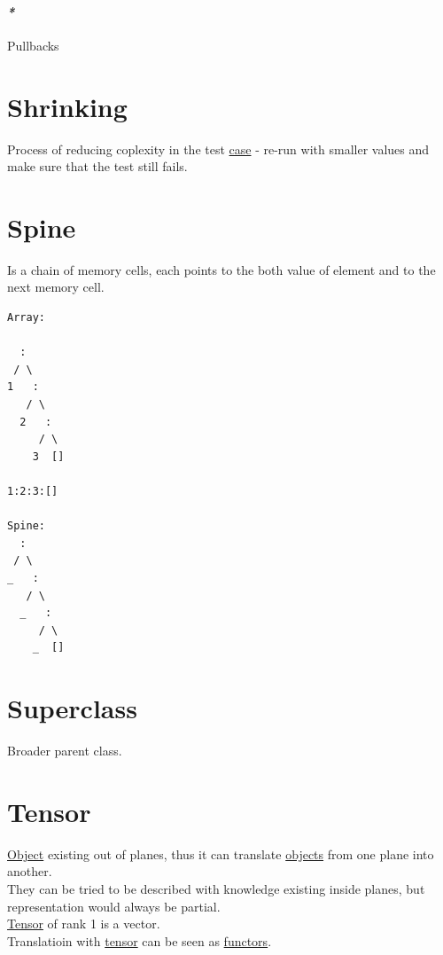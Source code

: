 \documentclass[a4paper,14pt,oneside]{book}
\begin{document}
\subsubsection{\emph{*}}
\label{sec:orgc83582e}
\label{org60d9c2c}Pullbacks\\

\chapter{\label{orge81de6c}Shrinking}
\label{sec:org14a23c2}
Process of reducing coplexity in the test \hyperref[orgcafada5]{case} - re-run with smaller values and make sure that the test still fails.\\

\chapter{\label{org8f6b9a1}Spine}
\label{sec:org7480179}
Is a chain of memory cells, each points to the both value of element and to the next memory cell.\\
\begin{verbatim}
Array:

  :
 / \
1   :
   / \
  2   :
     / \
    3  []

1:2:3:[]

Spine:
  :
 / \
_   :
   / \
  _   :
     / \
    _  []

\end{verbatim}

\chapter{\label{orgbd8e08c}Superclass}
\label{sec:org04be80a}
Broader parent class.\\

\chapter{\label{org0fa63f6}Tensor}
\label{sec:org6d921fc}
\hyperref[org920c789]{Object} existing out of planes, thus it can translate \hyperref[orgc973d87]{objects} from one plane into another.\\
They can be tried to be described with knowledge existing inside planes, but representation would always be partial.\\
\hyperref[org0fa63f6]{Tensor} of rank 1 is a vector.\\

Translatioin with \hyperref[org0fa63f6]{tensor} can be seen as \hyperref[org7eee6bb]{functors}.\\
\end{document}
